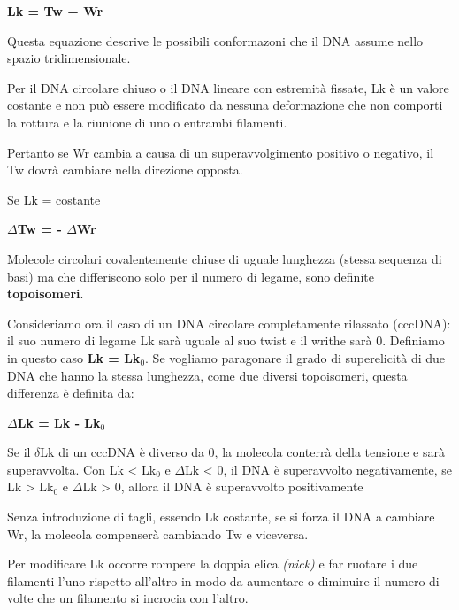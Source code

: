 \documentclass[11pt]{book}
\begin{document}
\textbf{Lk = Tw + Wr}

Questa equazione descrive le possibili conformazoni che il DNA assume
nello spazio tridimensionale.

Per il DNA circolare chiuso o il DNA lineare con estremità fissate, Lk è
un valore costante e non può essere modificato da nessuna deformazione
che non comporti la rottura e la riunione di uno o entrambi filamenti.

Pertanto se Wr cambia a causa di un superavvolgimento positivo o
negativo, il Tw dovrà cambiare nella direzione opposta.

Se Lk = costante

\textbf{\(\Delta\)Tw = - \(\Delta\)Wr}

Molecole circolari covalentemente chiuse di uguale lunghezza (stessa
sequenza di basi) ma che differiscono solo per il numero di legame, sono
definite \textbf{topoisomeri}.

Consideriamo ora il caso di un DNA circolare completamente rilassato
(cccDNA): il suo numero di legame Lk sarà uguale al suo twist e il
writhe sarà 0. Definiamo in questo caso \textbf{Lk = Lk\(_0\)}. Se
vogliamo paragonare il grado di superelicità di due DNA che hanno la
stessa lunghezza, come due diversi topoisomeri, questa differenza è
definita da:

\textbf{\(\Delta\)Lk = Lk - Lk\(_0\)}

Se il \(\delta\)Lk di un cccDNA è diverso da 0, la molecola conterrà
della tensione e sarà superavvolta. Con Lk \textless{} Lk\(_0\) e
\(\Delta\)Lk \textless{} 0, il DNA è superavvolto negativamente, se Lk
\textgreater{} Lk\(_0\) e \(\Delta\)Lk \textgreater{} 0, allora il DNA è
superavvolto positivamente

Senza introduzione di tagli, essendo Lk costante, se si forza il DNA a
cambiare Wr, la molecola compenserà cambiando Tw e viceversa.

Per modificare Lk occorre rompere la doppia elica \emph{(nick)} e far
ruotare i due filamenti l'uno rispetto all'altro in modo da aumentare o
diminuire il numero di volte che un filamento si incrocia con l'altro.
\end{document}
